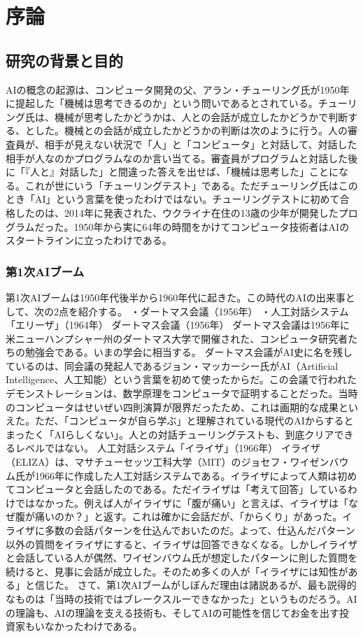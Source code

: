 \chapter{序論}
\section{研究の背景と目的}
AIの概念の起源は、コンピュータ開発の父、アラン・チューリング氏が1950年に提起した「機械は思考できるのか」という問いであるとされている。チューリング氏は、機械が思考したかどうかは、人との会話が成立したかどうかで判断する、とした。機械との会話が成立したかどうかの判断は次のように行う。人の審査員が、相手が見えない状況で「人」と「コンピュータ」と対話して、対話した相手が人なのかプログラムなのか言い当てる。審査員がプログラムと対話した後に「『人と』対話した」と間違った答えを出せば、「機械は思考した」ことになる。これが世にいう「チューリングテスト」である。ただチューリング氏はこのとき「AI」という言葉を使ったわけではない。チューリングテストに初めて合格したのは、2014年に発表された、ウクライナ在住の13歳の少年が開発したプログラムだった。1950年から実に64年の時間をかけてコンピュータ技術者はAIのスタートラインに立ったわけである。
\subsection{第1次AIブーム}
第1次AIブームは1950年代後半から1960年代に起きた。この時代のAIの出来事として、次の2点を紹介する。 ・ダートマス会議（1956年） ・人工対話システム「エリーザ」（1964年） ダートマス会議（1956年） ダートマス会議は1956年に米ニューハンプシャー州のダートマス大学で開催された、コンピュータ研究者たちの勉強会である。いまの学会に相当する。 ダートマス会議がAI史に名を残しているのは、同会議の発起人であるジョン・マッカーシー氏がAI（Artificial Intelligence、人工知能）という言葉を初めて使ったからだ。この会議で行われたデモンストレーションは、数学原理をコンピュータで証明することだった。当時のコンピュータはせいぜい四則演算が限界だったため、これは画期的な成果といえた。ただ、「コンピュータが自ら学ぶ」と理解されている現代のAIからするとまったく「AIらしくない」。人との対話チューリングテストも、到底クリアできるレベルではない。 人工対話システム「イライザ」（1966年） イライザ（ELIZA）は、マサチューセッツ工科大学（MIT）のジョセフ・ワイゼンバウム氏が1966年に作成した人工対話システムである。イライザによって人類は初めてコンピュータと会話したのである。ただイライザは「考えて回答」しているわけではなかった。例えば人がイライザに「腹が痛い」と言えば、イライザは「なぜ腹が痛いのか？」と返す。これは確かに会話だが、「からくり」があった。イライザに多数の会話パターンを仕込んでおいたのだ。よって、仕込んだパターン以外の質問をイライザにすると、イライザは回答できなくなる。しかしイライザと会話している人が偶然、ワイゼンバウム氏が想定したパターンに則した質問を続けると、見事に会話が成立した。そのため多くの人が「イライザには知性がある」と信じた。 さて、第1次AIブームがしぼんだ理由は諸説あるが、最も説得的なものは「当時の技術ではブレークスルーできなかった」というものだろう。AIの理論も、AIの理論を支える技術も、そしてAIの可能性を信じてお金を出す投資家もいなかったわけである。
